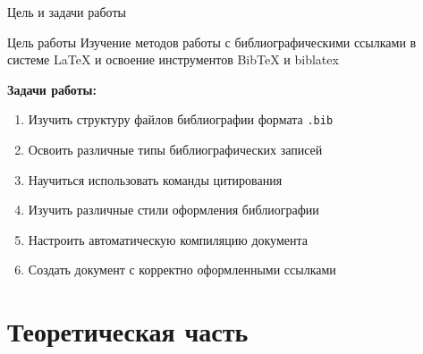 \documentclass[aspectratio=169, 12pt]{beamer}
\begin{document}
\begin{frame}{Цель и задачи работы}
  \begin{block}{Цель работы}
    Изучение методов работы с библиографическими ссылками в системе LaTeX и освоение инструментов BibTeX и biblatex
  \end{block}
  
  \vspace{0.5cm}
  
  \textbf{Задачи работы:}
  \begin{enumerate}
    \item Изучить структуру файлов библиографии формата \texttt{.bib}
    \item Освоить различные типы библиографических записей
    \item Научиться использовать команды цитирования
    \item Изучить различные стили оформления библиографии
    \item Настроить автоматическую компиляцию документа
    \item Создать документ с корректно оформленными ссылками
  \end{enumerate}
\end{frame}

\section{Теоретическая часть}
\end{document}
